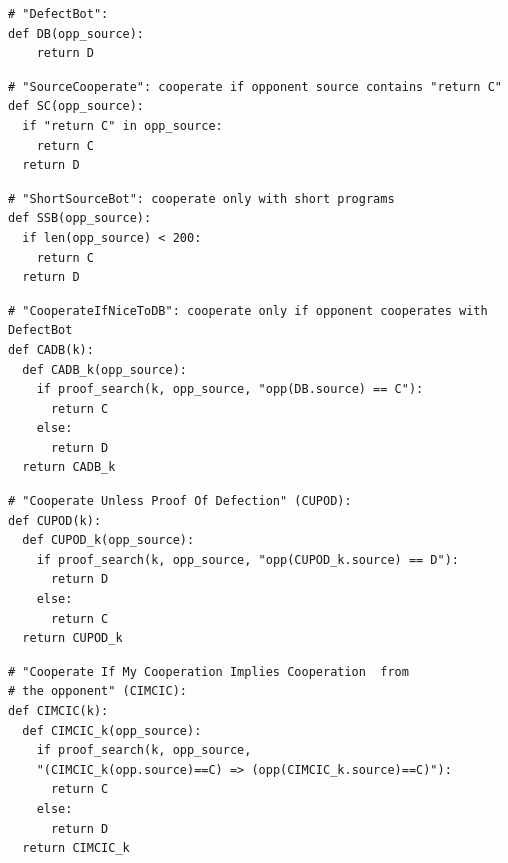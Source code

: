 \documentclass{article}
\begin{document}
\begin{verbatim}
# "DefectBot":
def DB(opp_source):
    return D
\end{verbatim}

\begin{verbatim}
# "SourceCooperate": cooperate if opponent source contains "return C"
def SC(opp_source):
  if "return C" in opp_source:
    return C
  return D
\end{verbatim}

\begin{verbatim}
# "ShortSourceBot": cooperate only with short programs
def SSB(opp_source):
  if len(opp_source) < 200:
    return C
  return D
\end{verbatim}

\begin{verbatim}
# "CooperateIfNiceToDB": cooperate only if opponent cooperates with DefectBot
def CADB(k):
  def CADB_k(opp_source):
    if proof_search(k, opp_source, "opp(DB.source) == C"):
      return C
    else:
      return D
  return CADB_k
\end{verbatim}

\newcommand{\cupod}{\Verb{CUPOD(k)}\xspace}
\begin{verbatim}
# "Cooperate Unless Proof Of Defection" (CUPOD):
def CUPOD(k):
  def CUPOD_k(opp_source):
    if proof_search(k, opp_source, "opp(CUPOD_k.source) == D"):
      return D
    else:
      return C
  return CUPOD_k
\end{verbatim}

\begin{verbatim}
# "Cooperate If My Cooperation Implies Cooperation  from
# the opponent" (CIMCIC):
def CIMCIC(k):
  def CIMCIC_k(opp_source):
    if proof_search(k, opp_source,
    "(CIMCIC_k(opp.source)==C) => (opp(CIMCIC_k.source)==C)"):
      return C
    else:
      return D
  return CIMCIC_k
\end{verbatim}    

\printbibliography
\end{document}
